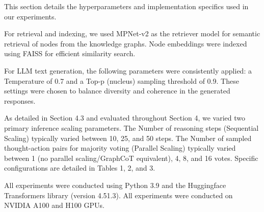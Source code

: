 This section details the hyperparameters and implementation specifics used in our experiments.

For retrieval and indexing, we used MPNet-v2 as the retriever model for semantic retrieval of nodes from the knowledge graphs. Node embeddings were indexed using FAISS \cite{johnson2019billion} for efficient similarity search.

For LLM text generation, the following parameters were consistently applied: a Temperature of 0.7 and a Top-p (nucleus) sampling threshold of 0.9. These settings were chosen to balance diversity and coherence in the generated responses.

As detailed in Section 4.3 and evaluated throughout Section 4, we varied two primary inference scaling parameters. The Number of reasoning steps (Sequential Scaling) typically varied between 10, 25, and 50 steps. The Number of sampled thought-action pairs for majority voting (Parallel Scaling) typically varied between 1 (no parallel scaling/GraphCoT equivalent), 4, 8, and 16 votes. Specific configurations are detailed in Tables 1, 2, and 3.

All experiments were conducted using Python 3.9 and the Huggingface Transformers library (version 4.51.3). All experiments were conducted on NVIDIA A100 and H100 GPUs.


